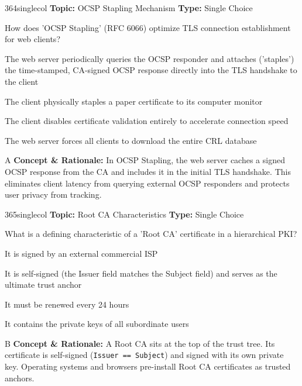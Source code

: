 \begin{qcard}{364}{singlecol}
\textcolor{darkslate!75}{\small\textbf{Topic:} OCSP Stapling Mechanism \hfill \textbf{Type:} Single Choice}\vspace{0.4em}\par
How does 'OCSP Stapling' (RFC 6066) optimize TLS connection establishment for web clients?
\begin{qoptions}
\item The web server periodically queries the OCSP responder and attaches ('staples') the time-stamped, CA-signed OCSP response directly into the TLS handshake to the client
\item The client physically staples a paper certificate to its computer monitor
\item The client disables certificate validation entirely to accelerate connection speed
\item The web server forces all clients to download the entire CRL database
\end{qoptions}
\end{qcard}
\nopagebreak
\begin{explainbox}{A}
\textbf{Concept \& Rationale:} In OCSP Stapling, the web server caches a signed OCSP response from the CA and includes it in the initial TLS handshake. This eliminates client latency from querying external OCSP responders and protects user privacy from tracking.
\end{explainbox}

\begin{qcard}{365}{singlecol}
\textcolor{darkslate!75}{\small\textbf{Topic:} Root CA Characteristics \hfill \textbf{Type:} Single Choice}\vspace{0.4em}\par
What is a defining characteristic of a 'Root CA' certificate in a hierarchical PKI?
\begin{qoptions}
\item It is signed by an external commercial ISP
\item It is self-signed (the Issuer field matches the Subject field) and serves as the ultimate trust anchor
\item It must be renewed every 24 hours
\item It contains the private keys of all subordinate users
\end{qoptions}
\end{qcard}
\nopagebreak
\begin{explainbox}{B}
\textbf{Concept \& Rationale:} A Root CA sits at the top of the trust tree. Its certificate is self-signed (\texttt{Issuer == Subject}) and signed with its own private key. Operating systems and browsers pre-install Root CA certificates as trusted anchors.
\end{explainbox}

